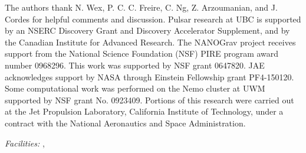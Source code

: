 \documentclass[iop,apj,tighten]{emulateapj}
\begin{document}






\acknowledgements
The authors thank N. Wex, P. C. C. Freire, C. Ng, Z. Arzoumanian, and J. Cordes for
helpful comments and discussion.
Pulsar research at UBC is supported by an NSERC Discovery Grant and Discovery
Accelerator Supplement, and by the Canadian Institute for Advanced Research.
The NANOGrav project receives support from the National Science Foundation
(NSF) PIRE program award number 0968296. This work was supported by NSF grant 0647820.
JAE acknowledges support by NASA through Einstein Fellowship grant PF4-150120. 
Some computational work was performed on the Nemo cluster at UWM supported 
by NSF grant No. 0923409. Portions of this research were carried out at the 
Jet Propulsion Laboratory, California Institute of Technology, under a contract 
with the National Aeronautics and Space Administration. 


{\it Facilities:}
, 
\end{document}
